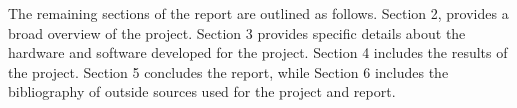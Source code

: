 The remaining sections of the report are outlined as follows. Section 2, provides a broad overview of the project. Section 3 provides specific details about the hardware and software developed for the project. Section 4 includes the results of the project. Section 5 concludes the report, while Section 6 includes the bibliography of outside sources used for the project and report.


